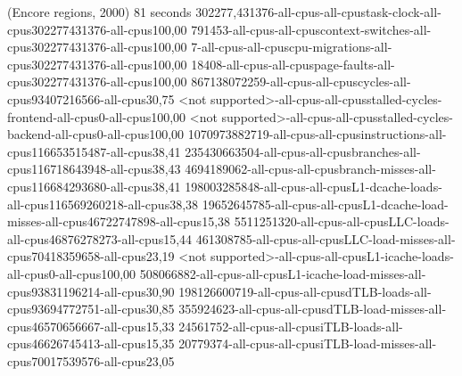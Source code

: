(Encore regions, 2000)
81 seconds
302277,431376-all-cpus-all-cpustask-clock-all-cpus302277431376-all-cpus100,00
791453-all-cpus-all-cpuscontext-switches-all-cpus302277431376-all-cpus100,00
7-all-cpus-all-cpuscpu-migrations-all-cpus302277431376-all-cpus100,00
18408-all-cpus-all-cpuspage-faults-all-cpus302277431376-all-cpus100,00
867138072259-all-cpus-all-cpuscycles-all-cpus93407216566-all-cpus30,75
<not supported>-all-cpus-all-cpusstalled-cycles-frontend-all-cpus0-all-cpus100,00
<not supported>-all-cpus-all-cpusstalled-cycles-backend-all-cpus0-all-cpus100,00
1070973882719-all-cpus-all-cpusinstructions-all-cpus116653515487-all-cpus38,41
235430663504-all-cpus-all-cpusbranches-all-cpus116718643948-all-cpus38,43
4694189062-all-cpus-all-cpusbranch-misses-all-cpus116684293680-all-cpus38,41
198003285848-all-cpus-all-cpusL1-dcache-loads-all-cpus116569260218-all-cpus38,38
19652645785-all-cpus-all-cpusL1-dcache-load-misses-all-cpus46722747898-all-cpus15,38
5511251320-all-cpus-all-cpusLLC-loads-all-cpus46876278273-all-cpus15,44
461308785-all-cpus-all-cpusLLC-load-misses-all-cpus70418359658-all-cpus23,19
<not supported>-all-cpus-all-cpusL1-icache-loads-all-cpus0-all-cpus100,00
508066882-all-cpus-all-cpusL1-icache-load-misses-all-cpus93831196214-all-cpus30,90
198126600719-all-cpus-all-cpusdTLB-loads-all-cpus93694772751-all-cpus30,85
355924623-all-cpus-all-cpusdTLB-load-misses-all-cpus46570656667-all-cpus15,33
24561752-all-cpus-all-cpusiTLB-loads-all-cpus46626745413-all-cpus15,35
20779374-all-cpus-all-cpusiTLB-load-misses-all-cpus70017539576-all-cpus23,05
